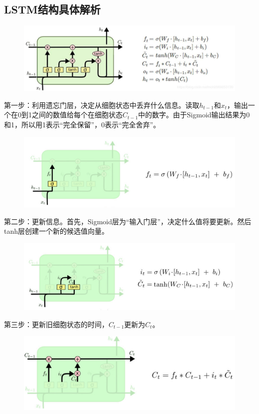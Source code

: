 \documentclass[openbib]{article}
\begin{document}
\subsection{LSTM结构具体解析}
\begin{figure}[htbp]
	\centering
	\includegraphics[scale=0.4]{LSTM}
\end{figure}
第一步：利用遗忘门层，决定从细胞状态中丢弃什么信息。读取$h_{t-1}$和$x_t$，输出一个在0到1之间的数值给每个在细胞状态$C_{t-1}$中的数字。由于Sigmoid输出结果为0和1，所以用1表示“完全保留”，0表示“完全舍弃”。
\begin{figure}[htbp]
	\centering
	\includegraphics[scale=0.4]{衰减系数计算过程}
\end{figure}

第二步：更新信息。首先，Sigmoid层为“输入门层”，决定什么值将要更新。然后tanh层创建一个新的候选值向量。
\begin{figure}[htbp]
	\centering
	\includegraphics[scale=0.4]{t时刻的记忆计算过程}
\end{figure}

第三步：更新旧细胞状态的时间，$C_{t-1}$更新为$C_t$。
\begin{figure}[htbp]
	\centering
	\includegraphics[scale=0.4]{更新时间}
\end{figure}
\end{document}
